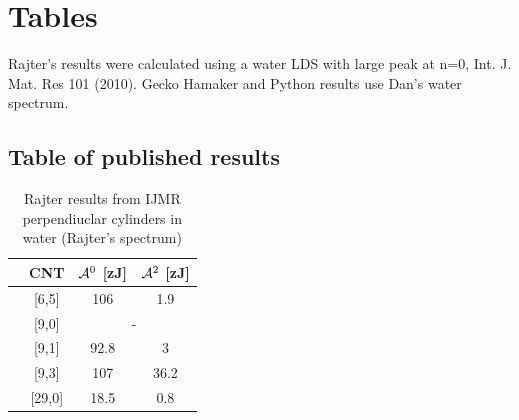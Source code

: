 \documentclass[a4paper]{article}
\begin{document}
\section{Tables}
\begin{center}
Rajter's results were calculated using a water LDS with large peak at n=0, Int.
J. Mat. Res 101 (2010).  Gecko Hamaker and Python results use Dan's water
spectrum.
\subsection{Table of published results}
\begin{table}[ht]
\caption{Rajter results from IJMR perpendiuclar cylinders in water (Rajter's spectrum)}
\centering
\begin{tabular}{l c|c|c}
  \hline  
  &\hspace{0.25in}CNT \hspace{0.25in}& \hspace{0.25in}${\cal A}^{0}$    [zJ]
  \hspace{0.25in}& \hspace{0.25in}${\cal A}^{2}$    [zJ] \hspace{0.25in}\\
  \hline\hline 
  &[6,5]  & 106 & 1.9 \\
  \hline
  &[9,0]  & \multicolumn{2}{c}{-}\\
  \hline
  &[9,1]  & 92.8 & 3 \\
  \hline
  &[9,3]  & 107 & 36.2 \\
  \hline
  &[29,0] & 18.5 & 0.8 \\
  \hline  
\end{tabular}
\label{table:nonlin}
\end{table}


\end{center}
\end{document}
